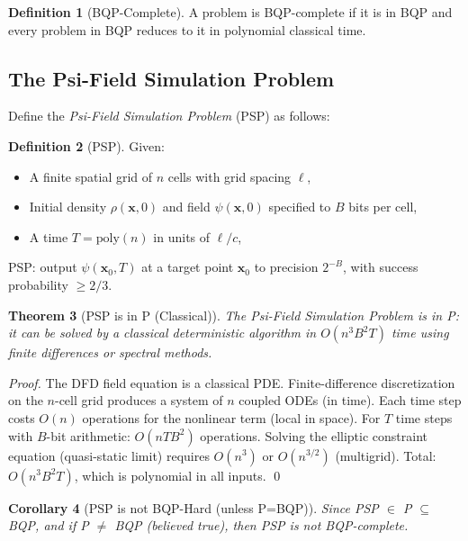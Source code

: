 \documentclass[11pt]{article}
\newtheorem{theorem}{Theorem}[section]
\newtheorem{corollary}[theorem]{Corollary}
\theoremstyle{definition}
\newtheorem{definition}[theorem]{Definition}
\theoremstyle{remark}
\begin{document}
\begin{definition}[BQP-Complete]
A problem is \textsc{BQP}-complete if it is in \textsc{BQP} and every
problem in \textsc{BQP} reduces to it in polynomial classical time.
\end{definition}

\subsection{The Psi-Field Simulation Problem}

Define the \emph{Psi-Field Simulation Problem} (PSP) as follows:

\begin{definition}[PSP]
Given:
\begin{itemize}[nosep]
\item A finite spatial grid of $n$ cells with grid spacing $\ell$,
\item Initial density $\rho(\mathbf{x},0)$ and field $\psi(\mathbf{x},0)$
  specified to $B$ bits per cell,
\item A time $T = \mathrm{poly}(n)$ in units of $\ell/c$,
\end{itemize}
\textsc{PSP}: output $\psi(\mathbf{x}_0, T)$ at a target point $\mathbf{x}_0$
to precision $2^{-B}$, with success probability $\geq 2/3$.
\end{definition}

\begin{theorem}[PSP is in P (Classical)]
\label{thm:psp_in_p}
The Psi-Field Simulation Problem is in \textsc{P}: it can be solved by
a classical deterministic algorithm in $O(n^3 B^2 T)$ time using finite
differences or spectral methods.
\end{theorem}

\begin{proof}
The DFD field equation is a classical PDE. Finite-difference
discretization on the $n$-cell grid produces a system of $n$ coupled
ODEs (in time). Each time step costs $O(n)$ operations for the
nonlinear term (local in space). For $T$ time steps with $B$-bit
arithmetic: $O(nTB^2)$ operations. Solving the elliptic constraint
equation (quasi-static limit) requires $O(n^3)$ or $O(n^{3/2})$
(multigrid). Total: $O(n^3 B^2 T)$, which is polynomial in all inputs.
\qed
\end{proof}

\begin{corollary}[PSP is not BQP-Hard (unless P=BQP)]
Since PSP $\in$ \textsc{P} $\subseteq$ \textsc{BQP}, and if
\textsc{P} $\neq$ \textsc{BQP} (believed true), then PSP is not
\textsc{BQP}-complete.
\end{corollary}
\end{document}
